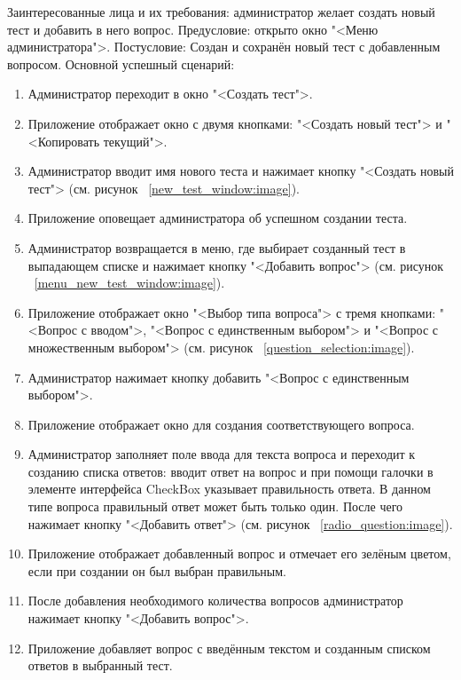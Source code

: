 Заинтересованные лица и их требования: администратор желает создать новый тест и добавить в него вопрос.
\newline Предусловие: открыто окно "<Меню администратора">.
\newline Постусловие: Создан и сохранён новый тест с добавленным вопросом.
\newline Основной успешный сценарий:
\begin{enumerate}
	\item Администратор переходит в окно "<Создать тест">.
	\item Приложение отображает окно с двумя кнопками: "<Создать новый тест"> и "<Копировать текущий">.
	\item Администратор вводит имя нового теста и нажимает кнопку "<Создать новый тест"> (см. рисунок ~\ref{new_test_window:image}).
	\item Приложение оповещает администратора об успешном создании теста. 
	\item Администратор возвращается в меню, где выбирает созданный тест в выпадающем списке и нажимает кнопку "<Добавить вопрос"> (см. рисунок ~\ref{menu_new_test_window:image}).
	\item Приложение отображает окно "<Выбор типа вопроса"> с тремя кнопками: "<Вопрос с вводом">, "<Вопрос с единственным выбором"> и "<Вопрос с множественным выбором"> (см. рисунок ~\ref{question_selection:image}).
	\item Администратор нажимает кнопку добавить "<Вопрос с единственным выбором">.
	\item Приложение отображает окно для создания соответствующего вопроса.
	\item Администратор заполняет поле ввода для текста вопроса и переходит к созданию списка ответов: вводит ответ на вопрос и при помощи галочки в элементе интерфейса CheckBox указывает правильность ответа. В данном типе вопроса правильный ответ может быть только один. После чего нажимает кнопку "<Добавить ответ"> (см. рисунок ~\ref{radio_question:image}).
	\item Приложение отображает добавленный вопрос и отмечает его зелёным цветом, если при создании он был выбран правильным.
	\item После добавления необходимого количества вопросов администратор нажимает кнопку "<Добавить вопрос">.
	\item Приложение добавляет вопрос с введённым текстом и созданным списком ответов в выбранный тест.
\end{enumerate}

